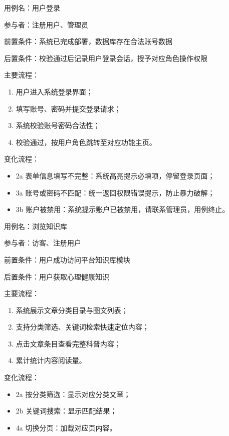 \par
\indent 用例名：用户登录
\par
\indent 参与者：注册用户、管理员
\par
\indent 前置条件：系统已完成部署，数据库存在合法账号数据
\par
\indent 后置条件：校验通过后记录用户登录会话，授予对应角色操作权限
\par
\indent 主要流程：
\begin{enumerate}
    \item 用户进入系统登录界面；
    \item 填写账号、密码并提交登录请求；
    \item 系统校验账号密码合法性；
    \item 校验通过，按用户角色跳转至对应功能主页。
\end{enumerate}
\par
\indent 变化流程：
\begin{itemize}
    \item 2a 表单信息填写不完整：系统高亮提示必填项，停留登录页面；
    \item 3a 账号或密码不匹配：统一返回权限错误提示，防止暴力破解；
    \item 3b 账户被禁用：系统提示账户已被禁用，请联系管理员，用例终止。
\end{itemize}

\par
\indent 用例名：浏览知识库
\par
\indent 参与者：访客、注册用户
\par
\indent 前置条件：用户成功访问平台知识库模块
\par
\indent 后置条件：用户获取心理健康知识
\par
\indent 主要流程：
\begin{enumerate}
    \item 系统展示文章分类目录与图文列表；
    \item 支持分类筛选、关键词检索快速定位内容；
    \item 点击文章条目查看完整科普内容；
    \item 累计统计内容阅读量。
\end{enumerate}
\par
\indent 变化流程：
\begin{itemize}
    \item 2a 按分类筛选：显示对应分类文章；
    \item 2b 关键词搜索：显示匹配结果；
    \item 4a 切换分页：加载对应页内容。
\end{itemize}

